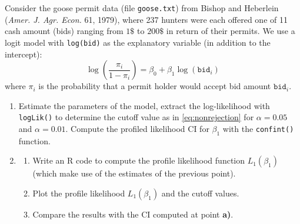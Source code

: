 \documentclass[a4paper,12pt]{article}\usepackage[]{graphicx}\usepackage[]{color}
\def\op{\left(}
\def\cp{\right)}
\begin{document}
Consider the goose permit data (file \texttt{goose.txt}) from Bishop and Heberlein (\textit{Amer. J. Agr. Econ.} 61, 1979), where 237 hunters were each offered one of 11 cash amount (bids) ranging from $1\$ $ to $ 200 \$ $ in return of their permits. We use a logit model with \texttt{log(bid)} as the explanatory variable (in addition to the intercept):
$$\log \op \frac{\pi_i}{1-\pi_i} \cp = \beta_0  + \beta_1 \log(\texttt{bid}_i) $$
where $\pi_i$ is the probability that a permit holder would accept bid amount $\texttt{bid}_i$.

%
\begin{enumerate}
    \item Estimate the parameters of the model, extract the log-likelihood with  \texttt{logLik()} to determine the cutoff value as in \eqref{eq:nonrejection} for $\alpha=0.05$ and $\alpha=0.01$. Compute the profiled likelihood CI for $\beta_1$ with the \texttt{confint()} function.
    \item 
\begin{enumerate}
    \item Write an R code to compute the profile likelihood function $L_1(\beta_1)$ (which make use of the estimates of the previous point). 
\item Plot the profile likelihood $L_1(\beta_1)$ and the cutoff values.  
\item Compare the results with the CI computed at point \textbf{a)}.
\end{enumerate}
\end{enumerate}
\end{document}
